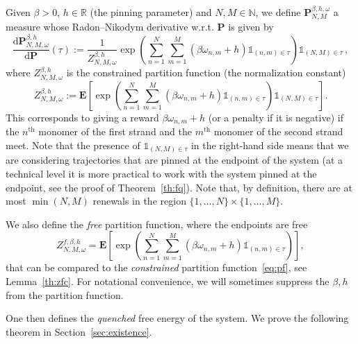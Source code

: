\documentclass[AHL,Unicode,longabstracts]{cedram}
\DeclareMathOperator{\tHt}{th}
\newcommand{\gb}{\beta}
\newcommand{\go}{\omega}
\newcommand{\unbf}%
{\mathds{1}}
\newcommand{\dd}{\mathrm{d}}
\newcommand{\bP}{\ensuremath{\mathbf{P}}}
\newcommand{\bE}{\ensuremath{\mathbf{E}}}
\newcommand{\bbN}{\ensuremath{\mathbb{N}}}
\newcommand{\bbR}{\ensuremath{\mathbb{R}}}
\begin{document}
Given $\beta >0$, $h \in \bbR$ (the pinning parameter) and $N,M \in \bbN$, we define $\bP_{N,M}^{\beta,h,\omega}$ a measure whose Radon--Nikodym derivative w.r.t. $\bP$ is given by
\begin{equation}
\frac{\dd \bP_{N,M,\omega}^{\beta,h}}{\dd \bP} (\tau) := \frac{1}{Z_{N,M, \omega}^{\beta,h}} \exp \!\left(\sum_{n=1}^N \sum_{m=1}^M (\beta \omega_{n,m}+h) \unbf_{(n,m) \in \tau} \right)\! \unbf_{(N,M)\in \tau}\,,
\end{equation}
where $Z_{N,M,\omega}^{\beta,h}$ is the constrained partition function (the normalization constant)
\begin{equation}\label{eq:pf}
Z_{N,M,\omega}^{\beta,h} := \bE \left[\exp\! \left(\sum_{n=1}^N \sum_{m=1}^M (\beta \omega_{n,m} +h) \unbf_{(n,m) \in \tau} \right)\! \unbf_{(N,M)\in \tau} \right].
\end{equation}
This corresponds to giving a reward $\gb \go_{n,m}+h$ (or a penalty if it is negative) if the $n^{\tHt}$ monomer of the first strand and the $m^{\tHt}$ monomer of the second strand meet. Note that the presence of $\unbf_{(N,M)\in \tau}$ in the right-hand side means that we are considering trajectories that are pinned at the endpoint of the system (at a technical level it is more practical to work with the system pinned at the endpoint, see the proof of Theorem~\ref{th:fq}). Note that, by definition, there are at most $\min (N,M)$ renewals in the region $\{1,\ldots, N\}\times \{1,\ldots, M\}$.

We also define the \emph{free} partition function, where the endpoints are free
\begin{equation}\label{eq:free}
Z^{f,\beta,h}_{N,M,\omega}= \bE \left[\exp \!\left(\sum_{n=1}^N \sum_{m=1}^M (\beta \omega_{n,m} +h) \unbf_{(n,m) \in \tau} \right) \right],
\end{equation}
that can be compared to the \emph{constrained} partition function~\eqref{eq:pf}, see Lemma~\ref{th:zfc}. For notational convenience, we will sometimes suppress the $\beta,h$ from the partition function.


One then defines the \emph{quenched} free energy of the system. We prove the following theorem in Section~\ref{sec:existence}.
\end{document}
